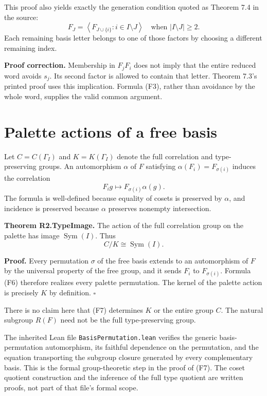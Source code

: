 This proof also yields exactly the generation condition quoted as
Theorem 7.4 in the source: \[
F_J=\left\langle F_{J\cup\{i\}}:i\in I\setminus J\right\rangle
\quad\text{when }|I\setminus J|\ge2.
\tag{F5}
\] Each remaining basis letter belongs to one of those factors by
choosing a different remaining index.

\textbf{Proof correction.} Membership in \(F_jF_i\) does not imply that
the entire reduced word avoids \(s_j\). Its second factor is allowed to
contain that letter. Theorem 7.3's printed proof uses this implication.
Formula (F3), rather than avoidance by the whole word, supplies the
valid common argument.

\section{Palette actions of a free
basis}\label{palette-actions-of-a-free-basis}

Let \(C=C(\Gamma_I)\) and \(K=K(\Gamma_I)\) denote the full correlation
and type-preserving groups. An automorphism \(\alpha\) of \(F\)
satisfying \(\alpha(F_i)=F_{\sigma(i)}\) induces the correlation \[
F_i g\longmapsto F_{\sigma(i)}\alpha(g).
\tag{F6}
\] The formula is well-defined because equality of cosets is preserved
by \(\alpha\), and incidence is preserved because \(\alpha\) preserves
nonempty intersection.

\textbf{Theorem R2.TypeImage.} The action of the full correlation group
on the palette has image \(\operatorname{Sym}(I)\). Thus \[
C/K\cong\operatorname{Sym}(I).
\tag{F7}
\]

\textbf{Proof.} Every permutation \(\sigma\) of the free basis extends
to an automorphism of \(F\) by the universal property of the free group,
and it sends \(F_i\) to \(F_{\sigma(i)}\). Formula (F6) therefore
realizes every palette permutation. The kernel of the palette action is
precisely \(K\) by definition. \(\square\)

There is no claim here that (F7) determines \(K\) or the entire group
\(C\). The natural subgroup \(R(F)\) need not be the full
type-preserving group.

The inherited Lean file \texttt{BasisPermutation.lean} verifies the
generic basis-permutation automorphism, its faithful dependence on the
permutation, and the equation transporting the subgroup closure
generated by every complementary basis. This is the formal
group-theoretic step in the proof of (F7). The coset quotient
construction and the inference of the full type quotient are written
proofs, not part of that file's formal scope.

